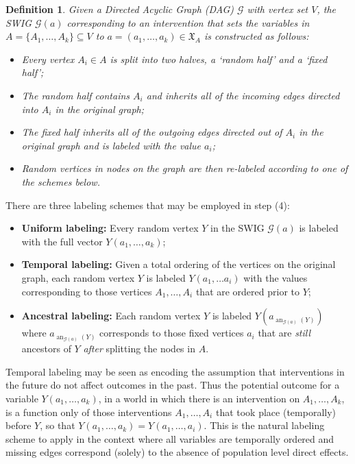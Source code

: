 \documentclass[11pt]{article}
\DeclareMathOperator{\an}{an}
\newtheorem{definition}[theorem]{Definition}
\newcommand{\G}{{\mathscr G}}
\begin{document}
\begin{definition}
Given a Directed Acyclic Graph (DAG) $\G$ with vertex set $V$, the SWIG $\G({a})$ corresponding to an intervention that sets the variables in $A=\{A_1,\ldots ,A_k\}\subseteq V$
to ${a}=(a_1,\ldots ,a_k) \in \mathfrak{X}_{A}$ is constructed as follows:
\begin{itemize}
\item[\rm (1)] Every vertex $A_i \in A$ is split into two halves, a `random half' and a `fixed half';
\item[\rm (2)] The random half contains $A_i$ and inherits all of the incoming edges directed into $A_i$ in the original graph;
\item[\rm (3)] The fixed half inherits all of the outgoing edges directed out of $A_i$ in the original graph and is labeled with the value $a_i$;
\item[\rm (4)] Random vertices in nodes on the graph are then re-labeled according to one of the schemes below.
\end{itemize}
\end{definition}

There are three labeling schemes that may be employed in step (4):
\begin{itemize}
\item[] {\bf Uniform labeling:} Every random vertex $Y$ in the SWIG $\G({a})$ is labeled with the full vector $Y({a_1,\ldots, a_k})$;
\item[] {\bf Temporal labeling:} Given a total ordering of the vertices on the original graph, each random vertex $Y$
is labeled $Y(a_1,\ldots a_i)$ with the values  corresponding to those vertices $A_1,\ldots , A_i$ that are ordered prior to $Y$;
\item[]{\bf Ancestral labeling:} Each random vertex $Y$ is labeled $Y(a_{\an_{\G(a)}(Y)})$ where ${a_{\an_{\G(a)}(Y)}}$ corresponds to those fixed vertices $a_i$ that are {\em still} ancestors of $Y$ {\em after} splitting the nodes in $A$.
\end{itemize}

Temporal labeling may be seen as encoding the assumption that interventions in the future do not affect outcomes in the past. Thus the potential outcome for a variable 
$Y(a_1,\ldots ,a_k)$, in a world in which there is an  intervention on $A_1,\ldots, A_k$,
is a function only of those interventions $A_1,\ldots, A_i$ that took place (temporally) before $Y$, so that $Y(a_1,\ldots ,a_k)= Y(a_1,\ldots ,a_i)$.
This is the natural labeling scheme to apply in the context where all variables are temporally ordered and missing edges correspond (solely) to the 
absence of population level direct effects.
\end{document}
